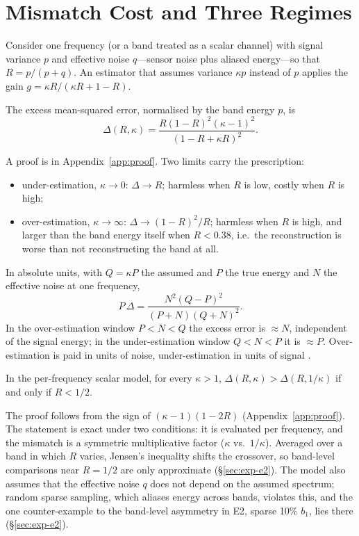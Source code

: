 \section{Mismatch Cost and Three Regimes}\label{sec:zones}

Consider one frequency (or a band treated as a scalar channel) with signal
variance $p$ and effective noise $q$---sensor noise plus aliased energy---so
that $R=p/(p+q)$. An estimator that assumes variance $\kappa p$ instead of $p$
applies the gain $g=\kappa R/(\kappa R+1-R)$.

\begin{proposition}\label{prop:mismatch}
The excess mean-squared error, normalised by the band energy $p$, is
\begin{equation}\label{eq:delta}
\Delta(R,\kappa)=\frac{R(1-R)^2(\kappa-1)^2}{(1-R+\kappa R)^2}.
\end{equation}
\end{proposition}
\noindent A proof is in Appendix~\ref{app:proof}. Two limits carry the
prescription:
\begin{itemize}
\item under-estimation, $\kappa\to0$: $\Delta\to R$; harmless when $R$ is low,
costly when $R$ is high;
\item over-estimation, $\kappa\to\infty$: $\Delta\to(1-R)^2/R$; harmless when
$R$ is high, and larger than the band energy itself when $R<0.38$, i.e.\ the
reconstruction is worse than not reconstructing the band at all.
\end{itemize}

\noindent In absolute units, with $Q=\kappa P$ the assumed and $P$ the true
energy and $N$ the effective noise at one frequency,
\begin{equation}\label{eq:delta-abs}
P\,\Delta=\frac{N^2(Q-P)^2}{(P+N)(Q+N)^2}.
\end{equation}
In the over-estimation window $P<N<Q$ the excess error is $\approx N$,
independent of the signal energy; in the under-estimation window $Q<N<P$ it is
$\approx P$. Over-estimation is paid in units of noise, under-estimation in
units of signal .

\begin{corollary}\label{cor:flip}
In the per-frequency scalar model, for every $\kappa>1$,
$\Delta(R,\kappa)>\Delta(R,1/\kappa)$ if and only if $R<1/2$.
\end{corollary}
\noindent The proof follows from the sign of $(\kappa-1)(1-2R)$
(Appendix~\ref{app:proof}). The statement is exact under two conditions: it is
evaluated per frequency, and the mismatch is a symmetric multiplicative factor
($\kappa$ vs.\ $1/\kappa$). Averaged over a band in which $R$ varies, Jensen's
inequality shifts the crossover, so band-level comparisons near $R=1/2$ are
only approximate (\S\ref{sec:exp-e2}). The model also assumes that the
effective noise $q$ does not depend on the assumed spectrum; random sparse
sampling, which aliases energy across bands, violates this, and the one
counter-example to the band-level asymmetry in E2, sparse 10\% $b_1$, lies
there (\S\ref{sec:exp-e2}).

